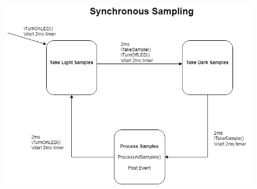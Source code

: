 \documentclass{article}
\begin{document}
\begin{figure}[H]
    \centering
    \includegraphics[scale = 0.5]{SynchronousSampling.png}
\end{figure}
\end{document}
